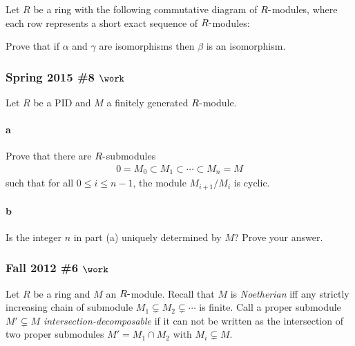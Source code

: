 Let \(R\) be a ring with the following commutative diagram of
\(R{\hbox{-}}\)modules, where each row represents a short exact sequence
of \(R{\hbox{-}}\)modules:

\begin{center}
\end{center}

Prove that if \(\alpha\) and \(\gamma\) are isomorphisms then \(\beta\)
is an isomorphism.

\hypertarget{spring-2015-8-work}{%
\subsubsection{\texorpdfstring{Spring 2015 \#8
\(\work\)}{Spring 2015 \#8 \textbackslash work}}\label{spring-2015-8-work}}

Let \(R\) be a PID and \(M\) a finitely generated \(R{\hbox{-}}\)module.

\hypertarget{a-87}{%
\paragraph{a}\label{a-87}}

Prove that there are \(R{\hbox{-}}\)submodules
\begin{align*}
0 = M_0 \subset M_1 \subset \cdots \subset M_n = M
\end{align*}
such that for all \(0\leq i \leq n-1\), the module \(M_{i+1}/M_i\) is
cyclic.

\hypertarget{b-77}{%
\paragraph{b}\label{b-77}}

Is the integer \(n\) in part (a) uniquely determined by \(M\)? Prove
your answer.

\hypertarget{fall-2012-6-work}{%
\subsubsection{\texorpdfstring{Fall 2012 \#6
\(\work\)}{Fall 2012 \#6 \textbackslash work}}\label{fall-2012-6-work}}

Let \(R\) be a ring and \(M\) an \(R{\hbox{-}}\)module. Recall that
\(M\) is \emph{Noetherian} iff any strictly increasing chain of
submodule \(M_1 \subsetneq M_2 \subsetneq \cdots\) is finite. Call a
proper submodule \(M' \subsetneq M\) \emph{intersection-decomposable} if
it can not be written as the intersection of two proper submodules
\(M' = M_1\cap M_2\) with \(M_i \subsetneq M\).

